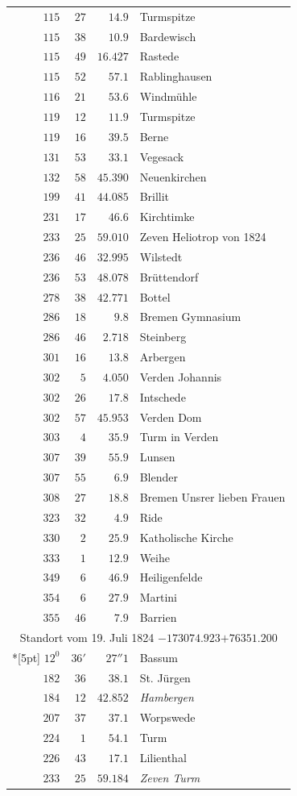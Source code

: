 \begin{longtable}{@{}rrrp{.61\linewidth}@{}}
\(115\)&\(27\)&\(14.9\)&\raggedright Turmspitze\tabularnewline
\(115\)&\(38\)&\(10.9\)&\raggedright Bardewisch\tabularnewline
\(115\)&\(49\)&\(16.427\)&\raggedright Rastede\tabularnewline
\(115\)&\(52\)&\(57.1\)&\raggedright Rablinghausen\tabularnewline
\(116\)&\(21\)&\(53.6\)&\raggedright Windmühle\tabularnewline
\(119\)&\(12\)&\(11.9\)&\raggedright Turmspitze\tabularnewline
\(119\)&\(16\)&\(39.5\)&\raggedright Berne\tabularnewline
\(131\)&\(53\)&\(33.1\)&\raggedright Vegesack\tabularnewline
\(132\)&\(58\)&\(45.390\)&\raggedright Neuenkirchen\tabularnewline
\(199\)&\(41\)&\(44.085\)&\raggedright Brillit\tabularnewline
\(231\)&\(17\)&\(46.6\)&\raggedright Kirchtimke\tabularnewline
\(233\)&\(25\)&\(59.010\)&\raggedright Zeven Heliotrop von 1824\tabularnewline
\(236\)&\(46\)&\(32.995\)&\raggedright Wilstedt\tabularnewline
\(236\)&\(53\)&\(48.078\)&\raggedright Brüttendorf\tabularnewline
\(278\)&\(38\)&\(42.771\)&\raggedright Bottel\tabularnewline
\(286\)&\(18\)&\(9.8\)&\raggedright Bremen Gymnasium\tabularnewline
\(286\)&\(46\)&\(2.718\)&\raggedright Steinberg\tabularnewline
\(301\)&\(16\)&\(13.8\)&\raggedright Arbergen\tabularnewline
\(302\)&\(5\)&\(4.050\)&\raggedright Verden Johannis\tabularnewline
\(302\)&\(26\)&\(17.8\)&\raggedright Intschede\tabularnewline
\(302\)&\(57\)&\(45.953\)&\raggedright Verden Dom\tabularnewline
\(303\)&\(4\)&\(35.9\)&\raggedright Turm in Verden\tabularnewline
\(307\)&\(39\)&\(55.9\)&\raggedright Lunsen\tabularnewline
\(307\)&\(55\)&\(6.9\)&\raggedright Blender\tabularnewline
\(308\)&\(27\)&\(18.8\)&\raggedright Bremen Unsrer lieben Frauen\tabularnewline
\(323\)&\(32\)&\(4.9\)&\raggedright Ride\tabularnewline
\(330\)&\(2\)&\(25.9\)&\raggedright Katholische Kirche\tabularnewline
\(333\)&\(1\)&\(12.9\)&\raggedright Weihe\tabularnewline
\(349\)&\(6\)&\(46.9\)&\raggedright Heiligenfelde\tabularnewline
\(354\)&\(6\)&\(27.9\)&\raggedright Martini\tabularnewline
\(355\)&\(46\)&\(7.9\)&\raggedright Barrien\tabularnewline
\multicolumn{4}{c}{Standort vom 19. Juli 1824 \(-173074.923\)\qquad\(+76351.200\)}\\*[5pt]
\(12^{0}\)&\(36'\)&\(27''1\)&\raggedright Bassum\tabularnewline
\(182\)&\(36\)&\(38.1\)&\raggedright St. Jürgen\tabularnewline
\(184\)&\(12\)&\(42.852\)&\raggedright \textit{Hambergen}\tabularnewline
\(207\)&\(37\)&\(37.1\)&\raggedright Worpswede\tabularnewline
\(224\)&\(1\)&\(54.1\)&\raggedright Turm\tabularnewline
\(226\)&\(43\)&\(17.1\)&\raggedright Lilienthal\tabularnewline
\(233\)&\(25\)&\(59.184\)&\raggedright \textit{Zeven Turm}\tabularnewline
\end{longtable}
\endgroup
